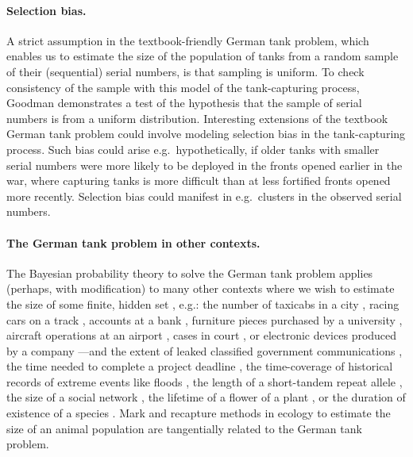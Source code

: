 \documentclass[11pt, oneside]{article}
\begin{document}
\paragraph{Selection bias.}
A strict assumption in the textbook-friendly German tank problem, which enables us to estimate the size of the population of tanks from a random sample of their (sequential) serial numbers, is that sampling is uniform. 
To check consistency of the sample with this model of the tank-capturing process, Goodman \cite{goodman1954some} demonstrates a test of the hypothesis that the sample of serial numbers is from a uniform distribution. 
Interesting extensions of the textbook German tank problem could involve modeling selection bias in the tank-capturing process. 
Such bias could arise e.g.\ hypothetically, if older tanks with smaller serial numbers were more likely to be deployed in the fronts opened earlier in the war, where capturing tanks is more difficult than at less fortified fronts opened more recently. Selection bias could manifest in e.g.\ clusters in the observed serial numbers.


\paragraph{The German tank problem in other contexts.}
The Bayesian probability theory to solve the German tank problem applies (perhaps, with modification) to many other contexts where we wish to estimate the size of some finite, hidden set \cite{cheng2020estimating}, e.g.: the number of taxicabs in a city \cite{grajalez2013great,comap}, racing cars on a track \cite{tenenbein1971racing}, accounts at a bank \cite{hohle2006bayesian}, furniture pieces purchased by a university \cite{goodman1954some}, aircraft operations at an airport \cite{mott2016estimation}, cases in court \cite{wu2022augmenting}, or electronic devices produced by a company \cite{iphoneguardian}---and the extent of leaked classified government communications \cite{gill2015estimating}, the time needed to complete a project deadline \cite{fehlmann2017new}, the time-coverage of historical records of extreme events like floods \cite{prosdocimi2018german}, 
 the length of a short-tandem repeat allele \cite{tang2017profiling}, the size of a social network \cite{katzir2011estimating}, the lifetime of a flower of a plant \cite{pearse2017statistical}, or the duration of existence of a species \cite{roberts2003did}.
Mark and recapture methods in ecology to estimate the size of an animal population \cite{nichols1992capture,chao2001overview} are tangentially related to the German tank problem.
\end{document}
